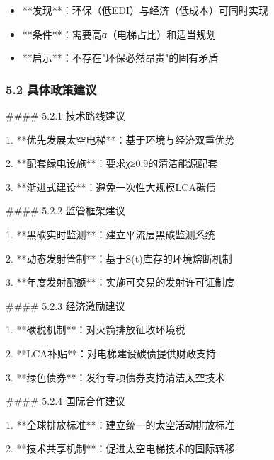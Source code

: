 \documentclass[a4paper,12pt]{article}
\begin{document}
\par
\begin{itemize}
\item **发现**：环保（低EDI）与经济（低成本）可同时实现
\end{itemize}
\begin{itemize}
\item **条件**：需要高α（电梯占比）和适当规划
\end{itemize}
\begin{itemize}
\item **启示**：不存在"环保必然昂贵"的固有矛盾
\end{itemize}
\subsubsection{5.2 具体政策建议}
#### 5.2.1 技术路线建议

\par
1. **优先发展太空电梯**：基于环境与经济双重优势

\par
2. **配套绿电设施**：要求χ≥0.9的清洁能源配套

\par
3. **渐进式建设**：避免一次性大规模LCA碳债

\par
#### 5.2.2 监管框架建议

\par
1. **黑碳实时监测**：建立平流层黑碳监测系统

\par
2. **动态发射管制**：基于S(t)库存的环境熔断机制

\par
3. **年度发射配额**：实施可交易的发射许可证制度

\par
#### 5.2.3 经济激励建议

\par
1. **碳税机制**：对火箭排放征收环境税

\par
2. **LCA补贴**：对电梯建设碳债提供财政支持

\par
3. **绿色债券**：发行专项债券支持清洁太空技术

\par
#### 5.2.4 国际合作建议

\par
1. **全球排放标准**：建立统一的太空活动排放标准

\par
2. **技术共享机制**：促进太空电梯技术的国际转移
\end{document}
